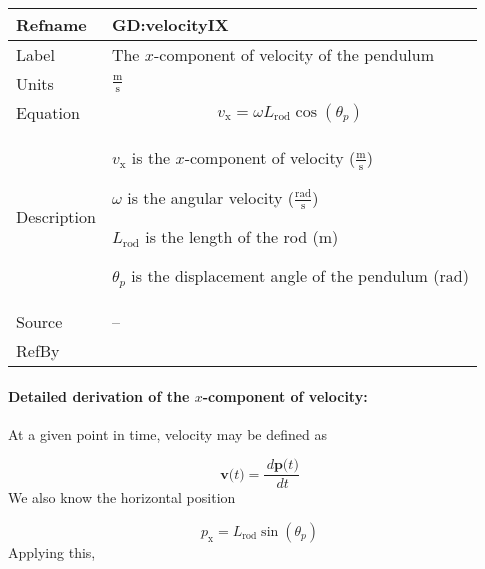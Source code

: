 \documentclass[12pt]{article}
\begin{document}
\vspace{\baselineskip}
\noindent
\begin{minipage}{\textwidth}
\begin{tabular}{>{\raggedright}p{}>{\raggedright\arraybackslash}p{}}
\toprule \textbf{Refname} & \textbf{GD:velocityIX}
\label{GD:velocityIX}
\\ \midrule
Label & The $x$-component of velocity of the pendulum
        
\\ \midrule
Units & $\frac{\text{m}}{\text{s}}$
        
\\ \midrule
Equation & \begin{displaymath}
           {v_{\text{x}}}=ω {L_{\text{rod}}} \cos\left({θ_{p}}\right)
           \end{displaymath}
\\ \midrule
Description & \begin{symbDescription}
              \item{${v_{\text{x}}}$ is the $x$-component of velocity ($\frac{\text{m}}{\text{s}}$)}
              \item{$ω$ is the angular velocity ($\frac{\text{rad}}{\text{s}}$)}
              \item{${L_{\text{rod}}}$ is the length of the rod (${\text{m}}$)}
              \item{${θ_{p}}$ is the displacement angle of the pendulum (${\text{rad}}$)}
              \end{symbDescription}
\\ \midrule
Source & --
         
\\ \midrule
RefBy & 
\\ \bottomrule
\end{tabular}
\end{minipage}
\paragraph{Detailed derivation of the $x$-component of velocity:}
\label{GD:velocityIXDeriv}
At a given point in time, velocity may be defined as

\begin{displaymath}
\symbf{v}\text{(}t\text{)}=\frac{\,d\symbf{p}\text{(}t\text{)}}{\,dt}
\end{displaymath}
We also know the horizontal position

\begin{displaymath}
{p_{\text{x}}}={L_{\text{rod}}} \sin\left({θ_{p}}\right)
\end{displaymath}
Applying this,
\end{document}
